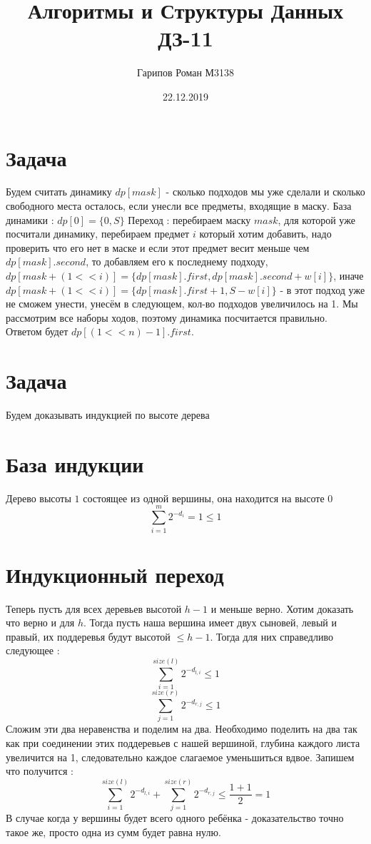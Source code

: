 \documentclass{article}
\title{Алгоритмы и Структуры Данных ДЗ-11}
\date{22.12.2019}
\author{Гарипов Роман М3138}
\begin{document}
  \maketitle
  \newpage

\section*{Задача }
Будем считать динамику $dp[mask]$ - сколько подходов мы уже сделали и сколько свободного места осталось, если унесли все предметы, входящие в маску.
\newline
База динамики : $dp[0] = \{0, S\}$
Переход : перебираем маску $mask$, для которой уже посчитали динамику, перебираем предмет $i$ который хотим добавить, надо проверить что его нет в маске и если этот предмет весит меньше чем $dp[mask].second$, 
\newline
то добавляем его к последнему подходу, 
\newline
$dp[mask + (1 << i)] = \{dp[mask].first, dp[mask].second + w[i]\}$, \newline
иначе $dp[mask + (1 << i)] = \{dp[mask].first + 1, S - w[i]\}$ - в этот подход уже не сможем унести, унесём в следующем, кол-во подходов увеличилось на 1.
Мы рассмотрим все наборы ходов, поэтому динамика посчитается правильно.
\newline
Ответом будет $dp[(1 << n) - 1].first$.

\section*{Задача }
Будем доказывать индукцией по высоте дерева
\section*{База индукции}
Дерево высоты $1$ состоящее из одной вершины, она находится на высоте 0
\newline
$$\sum_{i = 1}^{m}2^{-d_{i}} = 1 \leq 1$$
\section*{Индукционный переход}
Теперь пусть для всех деревьев высотой $h - 1$ и меньше верно. Хотим доказать что верно и для $h$.
\newline
Тогда пусть наша вершина имеет двух сыновей, левый и правый, их поддеревья будут высотой $\leq h - 1$. Тогда для них справедливо следующее :
$$\sum_{i = 1}^{size(l)}2^{-d_{l, i}} \leq 1$$
$$\sum_{j = 1}^{size(r)}2^{-d_{r, j}} \leq 1$$
Сложим эти два неравенства и поделим на два. Необходимо поделить на два так как при соединении этих поддеревьев с нашей вершиной, глубина каждого листа увеличится на 1, следовательно каждое слагаемое уменьшиться вдвое.
Запишем что получится :
$$\sum_{i = 1}^{size(l)}2^{-d_{l, i}} + \sum_{j = 1}^{size(r)}2^{-d_{r, j}}  \leq \frac{1 + 1}{2} = 1$$
В случае когда у вершины будет всего одного ребёнка - доказательство точно такое же, просто одна из сумм будет равна нулю.
\end{document}

